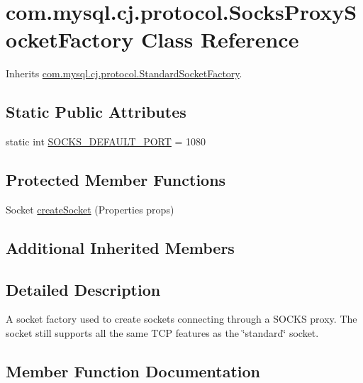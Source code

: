 \hypertarget{classcom_1_1mysql_1_1cj_1_1protocol_1_1_socks_proxy_socket_factory}{}\section{com.\+mysql.\+cj.\+protocol.\+Socks\+Proxy\+Socket\+Factory Class Reference}
\label{classcom_1_1mysql_1_1cj_1_1protocol_1_1_socks_proxy_socket_factory}


Inherits \mbox{\hyperlink{classcom_1_1mysql_1_1cj_1_1protocol_1_1_standard_socket_factory}{com.\+mysql.\+cj.\+protocol.\+Standard\+Socket\+Factory}}.

\subsection*{Static Public Attributes}
\begin{DoxyCompactItemize}
\item 
static int \mbox{\hyperlink{classcom_1_1mysql_1_1cj_1_1protocol_1_1_socks_proxy_socket_factory_af27432a7b73a88cdf4238cfdd9e4eec2}{S\+O\+C\+K\+S\+\_\+\+D\+E\+F\+A\+U\+L\+T\+\_\+\+P\+O\+RT}} = 1080
\end{DoxyCompactItemize}
\subsection*{Protected Member Functions}
\begin{DoxyCompactItemize}
\item 
Socket \mbox{\hyperlink{classcom_1_1mysql_1_1cj_1_1protocol_1_1_socks_proxy_socket_factory_af15aaabfd8044241f0baa01d2948adbb}{create\+Socket}} (Properties props)
\end{DoxyCompactItemize}
\subsection*{Additional Inherited Members}


\subsection{Detailed Description}
A socket factory used to create sockets connecting through a S\+O\+C\+KS proxy. The socket still supports all the same T\+CP features as the \char`\"{}standard\char`\"{} socket. 

\subsection{Member Function Documentation}
\mbox{\label{classcom_1_1mysql_1_1cj_1_1protocol_1_1_socks_proxy_socket_factory_af15aaabfd8044241f0baa01d2948adbb}} 
